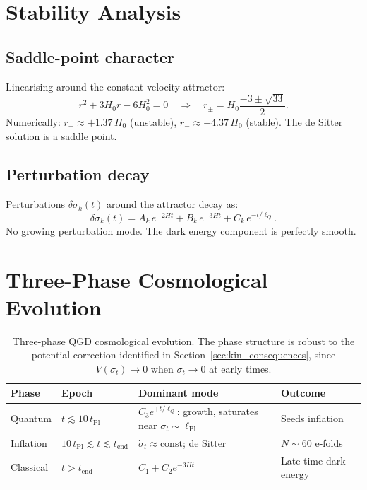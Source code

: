 \documentclass[11pt,a4paper]{article}
\theoremstyle{plain}
\theoremstyle{definition}
\theoremstyle{remark}
\newcommand{\lQ}{\ell_Q}
\newcommand{\dotv}{\dot\sigma_t}
\begin{document}
\section{Stability Analysis}
\label{sec:stability}

\subsection{Saddle-point character}

Linearising around the constant-velocity attractor:
\begin{equation}
  r^2 + 3H_0 r - 6H_0^2 = 0 \quad\Longrightarrow\quad
  r_\pm = H_0\frac{-3 \pm \sqrt{33}}{2}.
\end{equation}
Numerically: $r_+ \approx +1.37\,H_0$ (unstable), $r_- \approx
-4.37\,H_0$ (stable).  The de Sitter solution is a saddle point.

\subsection{Perturbation decay}

Perturbations $\delta\sigma_k(t)$ around the attractor decay as:
\begin{equation}
  \delta\sigma_k(t) = A_k\,e^{-2Ht} + B_k\,e^{-3Ht} + C_k\,e^{-t/\lQ}.
\end{equation}
No growing perturbation mode.  The dark energy component is perfectly
smooth.

\section{Three-Phase Cosmological Evolution}
\label{sec:phases}

\begin{table}[h]
  \centering
  \caption{Three-phase QGD cosmological evolution.  The phase
  structure is robust to the potential correction identified in
  Section~\ref{sec:kin_consequences}, since $V(\sigma_t) \to 0$
  when $\sigma_t \to 0$ at early times.}
  \label{tab:phases}
  \begin{tabular}{@{}p{1.9cm}p{3.3cm}p{4.6cm}p{3.5cm}@{}}
    \toprule
    Phase & Epoch & Dominant mode & Outcome \\
    \midrule
    Quantum & $t \lesssim 10\,t_{\mathrm{Pl}}$ &
      $C_3 e^{+t/\lQ}$: growth, saturates near $\sigma_t \sim \ell_{\mathrm{Pl}}$ &
      Seeds inflation \\[4pt]
    Inflation & $10\,t_{\mathrm{Pl}} \lesssim t \lesssim t_{\mathrm{end}}$ &
      $\dotv \approx \mathrm{const}$; de Sitter &
      $N \sim 60$ e-folds \\[4pt]
    Classical & $t > t_{\mathrm{end}}$ &
      $C_1 + C_2 e^{-3Ht}$ &
      Late-time dark energy \\
    \bottomrule
  \end{tabular}
\end{table}
\end{document}
